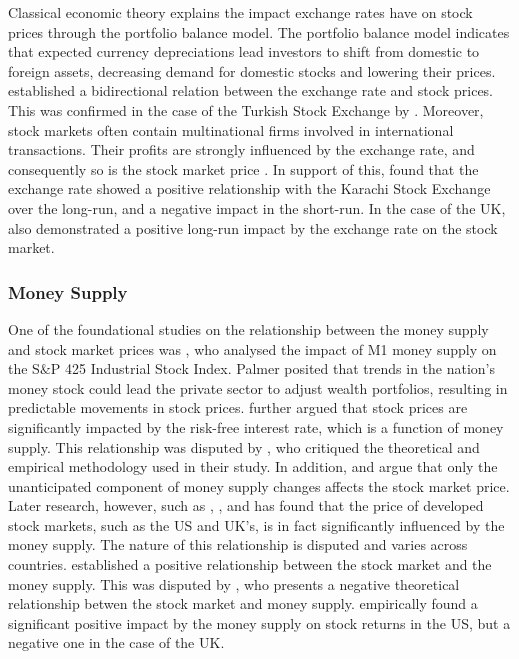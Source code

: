 \documentclass[11pt,a4paper]{article}
\newcommand{\citeboth}[1]{\citeauthor{#1} \citep{#1}}
\begin{document}
Classical economic theory explains the impact exchange rates have on stock prices through the portfolio balance model. The portfolio balance model indicates that expected currency depreciations lead investors to shift from domestic to foreign assets, decreasing demand for domestic stocks and lowering their prices. 
\citeboth{branson1977} established a bidirectional relation between the exchange rate and stock prices. This was confirmed
in the case of the Turkish Stock Exchange by \citeboth{aydemir2009}. 
Moreover, stock markets often contain multinational firms involved in international transactions. Their profits are strongly influenced by the exchange rate, and consequently so is the stock market price \citep{Wong2018}.
In support of this, \citeboth{khan2018} found that the exchange rate showed a positive relationship with the Karachi Stock Exchange over the long-run, and a negative impact in the short-run. 
In the case of the UK, \citeboth{wong2022} also demonstrated a positive long-run impact by the exchange rate on the stock market.

\subsubsection{Money Supply}

One of the foundational studies on the relationship between the money supply and 
stock market prices was \citeboth{palmer1970}, who analysed the impact of M1 money supply on the S$\&$P 425 Industrial Stock Index. 
Palmer posited that trends in the nation's money stock could lead the 
private sector to adjust wealth portfolios, resulting in 
predictable movements in stock prices. \citeboth{homa1971} further argued that 
stock prices are significantly impacted by the risk-free interest rate, 
which is a function of money supply. This relationship was disputed by \citeboth{pesando1974}, 
who critiqued the theoretical and empirical methodology used in their study. In addition, \citeboth{sorensen1982} and 
\citeboth{bernanke2005} argue that only the unanticipated component of money supply changes 
affects the stock market price. Later research, however, such as \citeboth{bahloul2017}, 
\citeboth{synek2024}, and \citeboth{pícha2017} has found that the price of developed stock markets, such as the US and UK's, is in fact significantly influenced by the money supply. 
The nature of this relationship is disputed and varies across countries. \citeboth{homa1971} established a positive relationship between the 
stock market and the money supply. This was disputed by \citeboth{sellin2001}, who presents a negative theoretical relationship betwen the stock market and money supply. \citeboth{olawale2014} empirically found a significant positive impact by the money supply on stock returns in the US, but a negative one in the case of the UK. 
\end{document}
